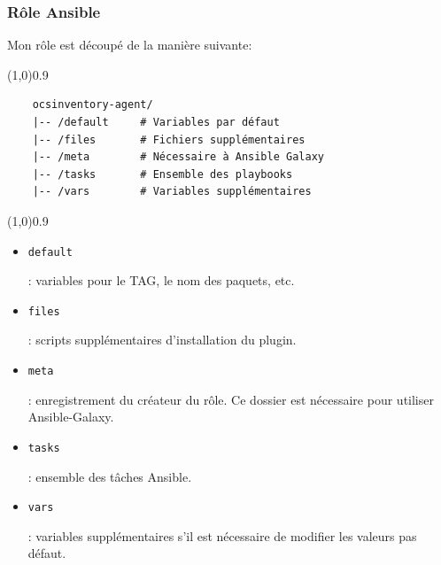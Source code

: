 \documentclass[12pt, a4paper, twoside]{article}
\begin{document}
\subsubsection{Rôle Ansible}
Mon rôle est découpé de la manière suivante:
\vspace{-1ex}
\begin{code}
\vspace{-1ex}
\begin{center} 
    \line(1,0){0.9\textwidth} 
\end{center}
\vspace{-1ex}
\begin{verbatim}
    ocsinventory-agent/
    |-- /default     # Variables par défaut
    |-- /files       # Fichiers supplémentaires
    |-- /meta        # Nécessaire à Ansible Galaxy
    |-- /tasks       # Ensemble des playbooks
    |-- /vars        # Variables supplémentaires
\end{verbatim}
\vspace{-1ex}
\begin{center} 
    \line(1,0){0.9\textwidth} 
\end{center}
\vspace{-1ex}
\end{code}

\begin{itemize}
    \item \begin{code}\texttt{default}\end{code}: variables pour le TAG, le nom des paquets, etc.
    \item \begin{code}\texttt{files}\end{code}: scripts supplémentaires d'installation du plugin.
    \item \begin{code}\texttt{meta}\end{code}: enregistrement du créateur du rôle. Ce dossier est nécessaire pour utiliser \gls{Ansible}-Galaxy.
    \item \begin{code}\texttt{tasks}\end{code}: ensemble des tâches \gls{Ansible}.
    \item \begin{code}\texttt{vars}\end{code}: variables supplémentaires s'il est nécessaire de modifier les valeurs pas défaut.
\end{itemize}
\end{document}

